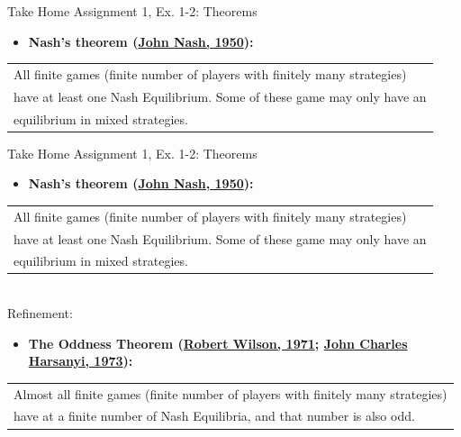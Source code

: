 \begin{frame}{Take Home Assignment 1, Ex. 1-2: Theorems}
  \begin{itemize}
    \item[(1)] \textbf{Nash's theorem (\href{https://rbsc.princeton.edu/sites/default/files/Non-Cooperative_Games_Nash.pdf}{John Nash, 1950}):}
  \end{itemize}
    \begin{tabular}{|l|}
      \cline{1-1}
        All finite games (finite number of players with finitely many strategies)\\
        have at least one Nash Equilibrium. Some of these game may only have an\\
        equilibrium in mixed strategies.\\\cline{1-1}
    \end{tabular}
  \vfill\null
\end{frame}
\begin{frame}{Take Home Assignment 1, Ex. 1-2: Theorems}
  \begin{itemize}
    \item[(1)] \textbf{Nash's theorem (\href{https://rbsc.princeton.edu/sites/default/files/Non-Cooperative_Games_Nash.pdf}{John Nash, 1950}):}
  \end{itemize}
    \begin{tabular}{|l|}
      \cline{1-1}
        All finite games (finite number of players with finitely many strategies)\\
        have at least one Nash Equilibrium. Some of these game may only have an\\
        equilibrium in mixed strategies.\\\cline{1-1}
    \end{tabular}\\\bigskip
  Refinement:
  \begin{itemize}
    \item[(2)] \textbf{The Oddness Theorem (\href{http://www.dklevine.com/archive/refs4402.pdf}{Robert Wilson, 1971}; \href{https://link.springer.com/article/10.1007\%2FBF01737572\#page-1 }{John Charles Harsanyi, 1973}):}
  \end{itemize}
    \begin{tabular}{|l|}
      \cline{1-1}
        Almost all finite games (finite number of players with finitely many strategies)\\
        have at a finite number of Nash Equilibria, and that number is also odd.\\\cline{1-1}
    \end{tabular}
  \vfill\null
\end{frame}
